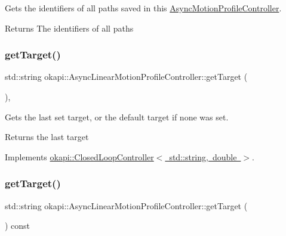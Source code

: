 Gets the identifiers of all paths saved in this {\ttfamily \mbox{\hyperlink{classokapi_1_1AsyncMotionProfileController}{Async\+Motion\+Profile\+Controller}}}.

\begin{DoxyReturn}{Returns}
The identifiers of all paths 
\end{DoxyReturn}
\mbox{\label{classokapi_1_1AsyncLinearMotionProfileController_afc9a1b30a5fd499c38455e8b05982be9}} 
\subsubsection{\texorpdfstring{getTarget()}{getTarget()}\hspace{0.1cm}{\footnotesize\ttfamily [1/2]}}
{\footnotesize\ttfamily std\+::string okapi\+::\+Async\+Linear\+Motion\+Profile\+Controller\+::get\+Target (\begin{DoxyParamCaption}{ }\end{DoxyParamCaption})\hspace{0.3cm}{\ttfamily [override]}, {\ttfamily [virtual]}}

Gets the last set target, or the default target if none was set.

\begin{DoxyReturn}{Returns}
the last target 
\end{DoxyReturn}


Implements \mbox{\hyperlink{classokapi_1_1ClosedLoopController_a22012bedbfaff6e5a3a508f274ec2497}{okapi\+::\+Closed\+Loop\+Controller$<$ std\+::string, double $>$}}.

\mbox{\label{classokapi_1_1AsyncLinearMotionProfileController_accae83d74f347e9a839eeae9d2693917}} 
\subsubsection{\texorpdfstring{getTarget()}{getTarget()}\hspace{0.1cm}{\footnotesize\ttfamily [2/2]}}
{\footnotesize\ttfamily std\+::string okapi\+::\+Async\+Linear\+Motion\+Profile\+Controller\+::get\+Target (\begin{DoxyParamCaption}{ }\end{DoxyParamCaption}) const\hspace{0.3cm}{\ttfamily [virtual]}}

